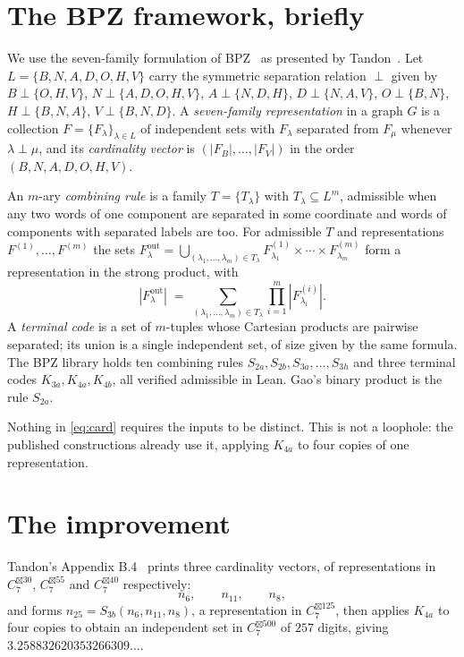 \documentclass[11pt]{article}
\theoremstyle{definition}
\begin{document}
\section{The BPZ framework, briefly}

We use the seven-family formulation of BPZ~\cite{BPZ2} as presented by Tandon~\cite{Tandon}. Let
$L = \{B, N, A, D, O, H, V\}$ carry the symmetric separation relation $\perp$ given by
$B \perp \{O,H,V\}$, $N \perp \{A,D,O,H,V\}$, $A \perp \{N,D,H\}$, $D \perp \{N,A,V\}$,
$O \perp \{B,N\}$, $H \perp \{B,N,A\}$, $V \perp \{B,N,D\}$. A \emph{seven-family
representation} in a graph $G$ is a collection $F = \{F_\lambda\}_{\lambda \in L}$ of independent
sets with $F_\lambda$ separated from $F_\mu$ whenever $\lambda \perp \mu$, and its
\emph{cardinality vector} is $(|F_B|, \ldots, |F_V|)$ in the order $(B,N,A,D,O,H,V)$.

An $m$-ary \emph{combining rule} is a family $T = \{T_\lambda\}$ with $T_\lambda \subseteq L^m$,
admissible when any two words of one component are separated in some coordinate and words of
components with separated labels are too. For admissible $T$ and representations
$F^{(1)}, \ldots, F^{(m)}$ the sets
$F^{\mathrm{out}}_\lambda = \bigcup_{(\lambda_1,\ldots,\lambda_m) \in T_\lambda}
 F^{(1)}_{\lambda_1} \times \cdots \times F^{(m)}_{\lambda_m}$
form a representation in the strong product, with
\begin{equation}\label{eq:card}
  |F^{\mathrm{out}}_\lambda| \;=\; \sum_{(\lambda_1,\ldots,\lambda_m) \in T_\lambda}
  \prod_{i=1}^m |F^{(i)}_{\lambda_i}|.
\end{equation}
A \emph{terminal code} is a set of $m$-tuples whose Cartesian products are pairwise separated; its
union is a single independent set, of size given by the same formula. The BPZ library holds ten
combining rules $S_{2a}, S_{2b}, S_{3a}, \ldots, S_{3h}$ and three terminal codes
$K_{3a}, K_{4a}, K_{4b}$, all verified admissible in Lean. Gao's binary product is the rule
$S_{2a}$.

Nothing in \eqref{eq:card} requires the inputs to be distinct. This is not a loophole: the
published constructions already use it, applying $K_{4a}$ to four copies of one representation.

\section{The improvement}

Tandon's Appendix B.4~\cite{Tandon} prints three cardinality vectors, of representations in
$C_7^{\boxtimes 30}$, $C_7^{\boxtimes 55}$ and $C_7^{\boxtimes 40}$ respectively:
\[
  n_6, \qquad n_{11}, \qquad n_8,
\]
and forms $n_{25} = S_{3b}(n_6, n_{11}, n_8)$, a representation in $C_7^{\boxtimes 125}$, then
applies $K_{4a}$ to four copies to obtain an independent set in $C_7^{\boxtimes 500}$ of $257$
digits, giving $3.258832620353266309\ldots$.
\end{document}
